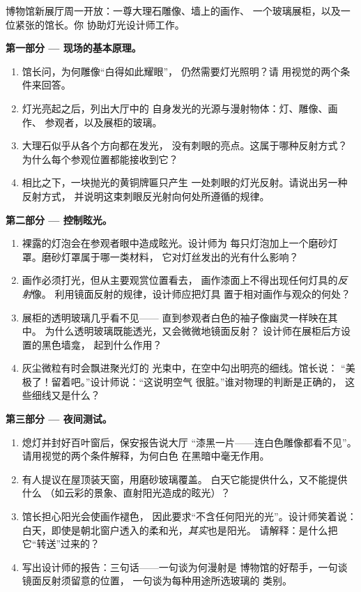 \begin{problem}\label{pb:g7:light-sources-propagation:1}
博物馆新展厅周一开放：一尊大理石雕像、墙上的画作、
一个玻璃展柜，以及一位紧张的馆长。你
协助灯光设计师工作。

\medskip\noindent\textbf{第一部分 --- 现场的基本原理。}
\begin{enumerate}
  \item 馆长问，为何雕像“白得如此耀眼”，
        仍然需要灯光照明？请
        用视觉的两个条件来回答。
  \item 灯光亮起之后，列出大厅中的
        自身发光的光源与漫射物体：灯、雕像、画作、
        参观者，以及展柜的玻璃。
  \item 大理石似乎从各个方向都在发光，
        没有刺眼的亮点。这属于哪种反射方式？
        为什么每个参观位置都能接收到它？
  \item 相比之下，一块抛光的黄铜牌匾只产生
        一处刺眼的灯光反射。请说出另一种反射方式，
        并说明这束刺眼反光射向何处所遵循的规律。
\end{enumerate}

\medskip\noindent\textbf{第二部分 --- 控制眩光。}
\begin{enumerate}[resume]
  \item 裸露的灯泡会在参观者眼中造成眩光。设计师为
        每只灯泡加上一个磨砂灯罩。磨砂灯罩属于哪一类材料，
        它对灯丝发出的光有什么影响？
  \item 画作必须打光，但从主要观赏位置看去，
        画作漆面上不得出现任何灯具的\emph{反射}像。
        利用镜面反射的规律，设计师应把灯具
        置于相对画作与观众的何处？
  \item 展柜的透明玻璃几乎看不见——
        直到参观者白色的袖子像幽灵一样映在其中。
        为什么透明玻璃既能透光，又会微微地镜面反射？
        设计师在展柜后方设置的黑色墙龛，
        起到什么作用？
  \item 灰尘微粒有时会飘进聚光灯的
        光束中，在空中勾出明亮的细线。馆长说：
        “美极了！留着吧。”设计师说：“这说明空气
        很脏。”谁对物理的判断是正确的，
        这些细线又是什么？
\end{enumerate}

\medskip\noindent\textbf{第三部分 --- 夜间测试。}
\begin{enumerate}[resume]
  \item 熄灯并封好百叶窗后，保安报告说大厅
        “漆黑一片——连白色雕像都看不见”。
        请用视觉的两个条件解释，为何白色
        在黑暗中毫无作用。
  \item 有人提议在屋顶装天窗，用磨砂玻璃覆盖。
        白天它能提供什么，又不能提供什么
        （如云彩的景象、直射阳光造成的眩光）？
  \item 馆长担心阳光会使画作褪色，
        因此要求“不含任何阳光的光”。设计师笑着说：
        白天，即使是朝北窗户透入的柔和光，\emph{其实}也是阳光。
        请解释：是什么把它“转送”过来的？
  \item 写出设计师的报告：三句话——一句谈为何漫射是
        博物馆的好帮手，一句谈镜面反射须留意的位置，
        一句谈为每种用途所选玻璃的
        类别。
\end{enumerate}
\end{problem}
